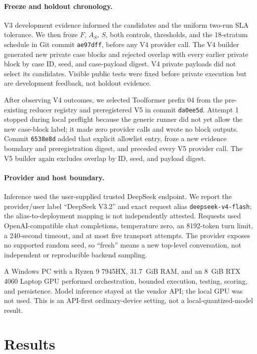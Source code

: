 \documentclass[letterpaper]{article} %
\begin{document}
\paragraph{Freeze and holdout chronology.}
V3 development evidence informed the candidates and the uniform two-run SLA
tolerance.  We then froze $F$, $A_S$, $S$, both controls, thresholds, and the
18-stratum schedule in Git commit \texttt{ae97dff}, before any V4 provider call.
The V4 builder generated new private case blocks and rejected overlap with every
earlier private block by case ID, seed, and case-payload digest.  V4 private
payloads did not select its candidates.  Visible public tests were fixed before
private execution but are development feedback, not holdout evidence.

After observing V4 outcomes, we selected Toolformer prefix 04 from the
pre-existing reducer registry and preregistered V5 in commit \texttt{da0ee5d}.
Attempt 1 stopped during local preflight because the generic runner did not yet
allow the new case-block label; it made zero provider calls and wrote no block
outputs.  Commit \texttt{6538e8d} added that explicit allowlist entry, froze a
new evidence boundary and preregistration digest, and preceded every V5 provider
call.  The V5 builder again excludes overlap by ID, seed, and payload digest.

\paragraph{Provider and host boundary.}
Inference used the user-supplied trusted DeepSeek endpoint.  We report the
provider/user label ``DeepSeek V3.2'' and exact request alias
\texttt{deepseek-v4-flash}; the alias-to-deployment mapping is not independently
attested.  Requests used OpenAI-compatible chat completions, temperature zero,
an 8192-token turn limit, a 240-second timeout, and at most five transport
attempts.  The provider exposes no supported random seed, so ``fresh'' means a
new top-level conversation, not independent or reproducible backend sampling.

A Windows PC with a Ryzen 9 7945HX, 31.7~GiB RAM, and an 8~GiB RTX 4060 Laptop
GPU performed orchestration, bounded execution, testing, scoring, and persistence.
Model inference stayed at the vendor API; the local GPU was not used.  This is an
API-first ordinary-device setting, not a local-quantized-model result.

\section{Results}
\end{document}
